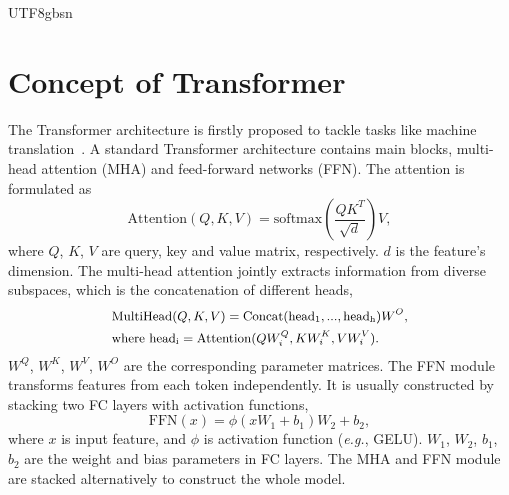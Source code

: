 \documentclass[10pt,journal,compsoc]{IEEEtran}
\newcommand{\eg}{\emph{e.g.}}
\newcommand{\<}{\left\langle}
\renewcommand{\>}{\right\rangle}
\newcommand{\1}{\mathbbm{1}}
\begin{document}
\begin{CJK}{UTF8}{gbsn}




\section{Concept of Transformer} 

\label{sec:trans}

The Transformer architecture is firstly proposed to tackle tasks like machine translation~\cite{vaswani2017attention}. A standard Transformer architecture contains main blocks,  multi-head attention (MHA)  and  feed-forward networks (FFN). The attention is formulated as  
\begin{equation}
	\mathrm{Attention}(Q, K, V) = \mathrm{softmax}(\frac{QK^T}{\sqrt{d}})V,
\end{equation}
where $Q$, $K$, $V$ are query, key and value matrix, respectively. $d$ is the feature's dimension. The multi-head attention jointly extracts information from diverse subspaces, which is the concatenation of different heads, 
\begin{equation}
	\label{eq:mulhead}
	\small
	\begin{aligned}
		&\mathrm{MultiHead}(Q, K, V) = \mathrm{Concat}(\mathrm{head_1}, ..., \mathrm{head_h})W^O,\\
		&\text{where}~\mathrm{head_i} = \mathrm{Attention}(QW^Q_i, KW^K_i, VW^V_i).\\
	\end{aligned}
\end{equation}
$W^Q$, $W^K$, $W^V$, $W^O$ are the corresponding parameter matrices. The FFN module transforms  features from each token independently. It is usually constructed by stacking two FC layers with activation functions, 
\begin{equation}
	\label{eq:ffn}
	\mathrm{FFN}(x)=\phi(xW_1 + b_1) W_2 + b_2,
\end{equation}
where $x$ is input feature, and  $\phi$ is activation function (\eg, GELU). $W_1$, $W_2$, $b_1$, $b_2$ are the weight and bias parameters in FC layers. The MHA and FFN module are stacked alternatively to construct the whole model.


\end{CJK}
\end{document}
